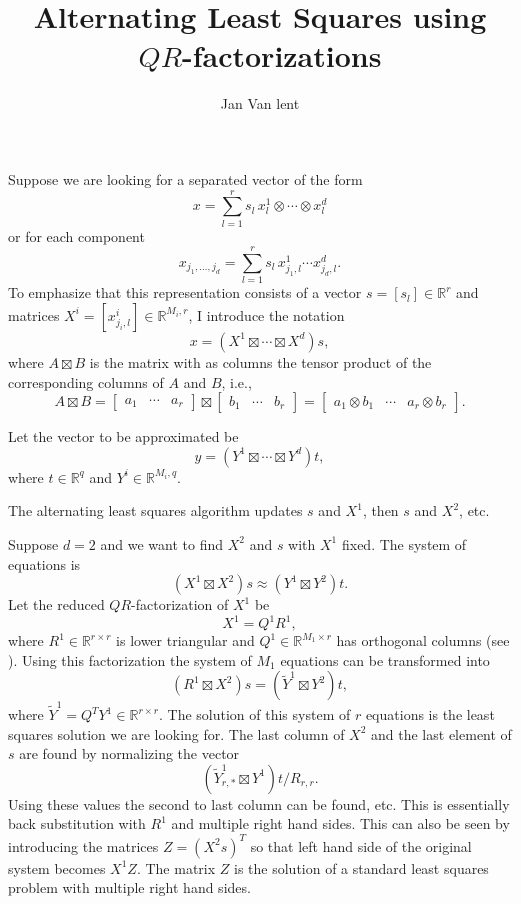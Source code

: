 \documentclass[12pt]{artikel3}
\title{Alternating Least Squares using $QR$-factorizations}
\author{Jan Van lent}
\newcommand{\R}{\mathbb{R}}
\begin{document}
\maketitle

Suppose we are looking for a separated vector of the form
\[x = \sum_{l=1}^r s_l \, x^1_l \otimes \dotsb \otimes x^d_l\]
or for each component
\[x_{j_1,\dotsc,j_d} = 
\sum_{l=1}^r s_l \, x^1_{j_1,l} \dotsm x^d_{j_d,l}.\] 
To emphasize that this representation consists of a vector \(s =
[s_l] \in \R^r\) and matrices \(X^i = [x^i_{j_i,l}] \in \R^{M_i, r}\), 
I introduce the notation
\[x = ( X^1 \boxtimes \dotsb \boxtimes X^d ) s,\]
where \(A \boxtimes B\) is the matrix with as columns the tensor
product of the corresponding columns of \(A\) and \(B\), i.e.,
\[ A \boxtimes B = 
\left[\begin{array}{ccc} a_1 & \cdots & a_r \end{array}\right] \boxtimes 
\left[\begin{array}{ccc} b_1 & \cdots & b_r \end{array}\right] =
\left[\begin{array}{ccc} a_1 \otimes b_1 & \cdots & 
a_r \otimes b_r \end{array}\right].\]

Let the vector to be approximated be 
\[y = ( Y^1 \boxtimes \dotsb \boxtimes Y^d ) t,\]
where \(t \in \R^q\) and \(Y^i \in \R^{M_i, q}\).  

The alternating least squares algorithm updates \(s\) and \(X^1\),
then \(s\) and \(X^2\), etc.

Suppose \(d = 2\) and we want to find \(X^2\) and \(s\) with \(X^1\)
fixed. The system of equations is
\[ ( X^1 \boxtimes X^2 ) s \approx ( Y^1 \boxtimes Y^2 ) t. \]
Let the reduced \(QR\)-factorization of \(X^1\) be
\[X^1 = Q^1 R^1,\]
where \(R^1 \in \R^{r \times r}\) is lower triangular and
\(Q^1 \in \R^{M_1 \times r}\) has orthogonal columns (see
\cite{GVL96}).  Using this factorization the system of \(M_1\)
equations can be transformed into
\[ ( R^1 \boxtimes X^2 ) s = ( \tilde{Y}^1 \boxtimes Y^2 ) t, \]
where \(\tilde{Y}^1 = Q^T Y^1 \in \R^{r \times r}\). The
solution of this system of \(r\) equations is the least squares
solution we are looking for. The last column of \(X^2\) and the last
element of \(s\) are found by normalizing the vector
\[ ( \tilde{Y}^1_{r,*} \boxtimes Y^1 ) t / R_{r,r}. \]
Using these values the second to last column can be found, etc. This
is essentially back substitution with \(R^1\) and multiple right hand
sides. This can also be seen by introducing the matrices \(Z = (X^2
s)^T\) so that left hand side of the original system becomes \(X^1
Z\). The matrix \(Z\) is the solution of a standard least squares
problem with multiple right hand sides.
\end{document}
